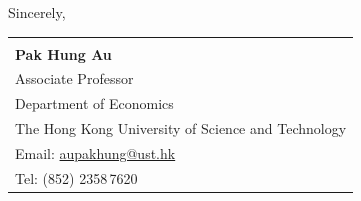 \documentclass[11pt,a4paper]{letter}
\begin{document}
\vspace{0.9cm}

Sincerely,

\vspace{1.8cm}

\noindent
\begin{tabular}{@{}l@{}}
\hrulefill\\[0.25em]
\textbf{Pak Hung Au}\\
Associate Professor\\
Department of Economics\\
The Hong Kong University of Science and Technology\\
Email: \href{mailto:aupakhung@ust.hk}{aupakhung@ust.hk}\\
Tel: (852) 2358\,7620
\end{tabular}
\end{document}
